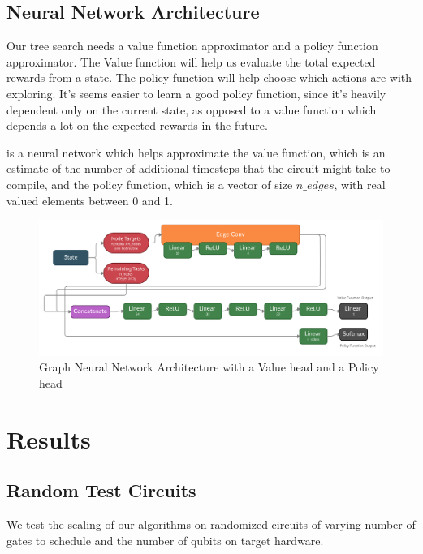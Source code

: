 \documentclass[%
 reprint,
 amsmath,amssymb,
 aps,
]{revtex4-2}
\begin{document}
\subsection{\label{sec:method-architecture}Neural Network Architecture}

Our tree search needs a value function approximator and a policy function approximator. The Value function will help us evaluate the total expected rewards from a state. The policy function will help choose which actions are with exploring. It's seems easier to learn a good policy function, since it's heavily dependent only on the current state, as opposed to a value function which depends a lot on the expected rewards in the future.

is a neural network which helps approximate the value function, which is an estimate of the number of additional timesteps that the circuit might take to compile, and the policy function, which is a vector of size $n\_edges$, with real valued elements between 0 and 1.

\begin{figure}[btp]
    \includegraphics[width=\textwidth]{images/network-architecture.jpg}
    \caption{\label{fig:network-architecture}
        Graph Neural Network Architecture with a Value head and a Policy head}
\end{figure}


\section{\label{sec:results}Results}

\subsection{\label{sec:results-random}Random Test Circuits}

We test the scaling of our algorithms on randomized circuits of varying number of gates to schedule and the number of qubits on target hardware.
\end{document}
